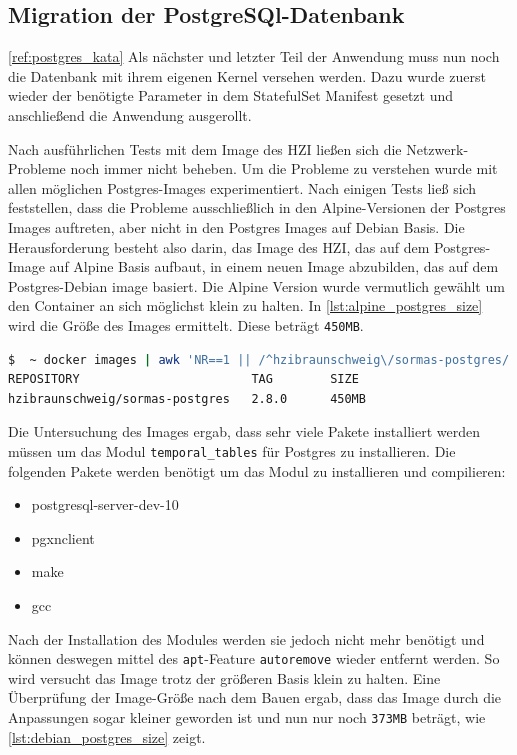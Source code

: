 \subsection{Migration der PostgreSQl-Datenbank}
\ref{ref:postgres_kata}
Als nächster und letzter Teil der Anwendung muss nun noch die Datenbank mit ihrem eigenen Kernel versehen werden.
Dazu wurde zuerst wieder der benötigte Parameter in dem StatefulSet Manifest gesetzt und anschließend die Anwendung ausgerollt.


Nach ausführlichen Tests mit dem Image des HZI ließen sich die Netzwerk-Probleme noch immer nicht beheben.
Um die Probleme zu verstehen wurde mit allen möglichen Postgres-Images experimentiert.
Nach einigen Tests ließ sich feststellen, dass die Probleme ausschließlich in den Alpine-Versionen der Postgres Images auftreten, aber nicht in den Postgres Images auf Debian Basis. 
Die Herausforderung besteht also darin, das Image des \ac{HZI}, das auf dem Postgres-Image auf Alpine Basis aufbaut, in einem neuen Image abzubilden, das auf dem Postgres-Debian image basiert.
Die Alpine Version wurde vermutlich gewählt um den Container an sich möglichst klein zu halten. 
In \ref{lst:alpine_postgres_size} wird die Größe des Images ermittelt.
Diese beträgt \texttt{450MB}.

\begin{lstlisting}[language=bash, caption={Größe des Postgres Images}, label=lst:alpine_postgres_size]
$  ~ docker images | awk 'NR==1 || /^hzibraunschweig\/sormas-postgres/ {printf "%-33s %-10s %s\n", $1, $2, $NF}'
REPOSITORY                        TAG        SIZE
hzibraunschweig/sormas-postgres   2.8.0      450MB
\end{lstlisting}

Die Untersuchung des Images ergab, dass sehr viele Pakete installiert werden müssen um das Modul \texttt{temporal\_tables} für Postgres zu installieren.
Die folgenden Pakete werden benötigt um das Modul zu installieren und compilieren:
\begin{itemize}
  \item postgresql-server-dev-10
  \item pgxnclient 
  \item make
  \item gcc
\end{itemize}

Nach der Installation des Modules werden sie jedoch nicht mehr benötigt und können deswegen mittel des \texttt{apt}-Feature \texttt{autoremove} wieder entfernt werden. 
So wird versucht das Image trotz der größeren Basis klein zu halten.
Eine Überprüfung der Image-Größe nach dem Bauen ergab, dass das Image durch die Anpassungen sogar kleiner geworden ist und nun nur noch \texttt{373MB} beträgt, wie \ref{lst:debian_postgres_size} zeigt.

